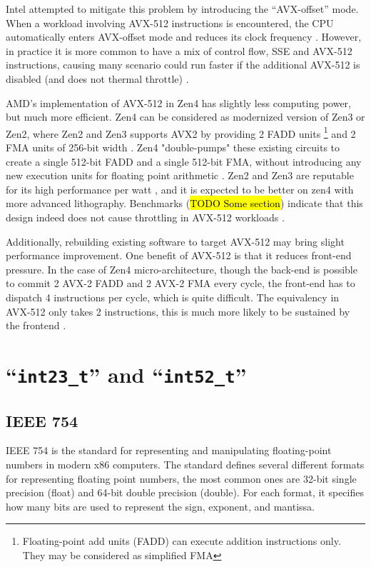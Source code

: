 \documentclass[logo,bsc,singlespacing,parskip]{infthesis}
\begin{document}
Intel attempted to mitigate this problem by introducing the ``AVX-offset'' mode.
When a workload involving AVX-512 instructions is encountered, the CPU
automatically enters AVX-offset mode and reduces its clock frequency
\cite{AVX-offset}. However, in practice it is more common to have a mix of
control flow, SSE and AVX-512 instructions, causing many scenario could run
faster if the additional AVX-512 is disabled (and does not thermal throttle)
\cite{Zen4Critique}.

AMD’s implementation of AVX-512 in Zen4 has slightly less computing power, but
much more efficient. Zen4 can be considered as modernized version of Zen3 or
Zen2, where Zen2 and Zen3 supports AVX2 by providing 2 FADD units
\footnote{Floating-point add units (FADD) can execute addition instructions
only. They may be considered as simplified FMA} and 2 FMA units of 256-bit width
\cite{Zen2ChipWiki}. Zen4 "double-pumps" these existing circuits to create a
single 512-bit FADD and a single 512-bit FMA, without introducing any new
execution units for floating point arithmetic \cite{Zen4Critique}. Zen2 and Zen3
are reputable for its high performance per watt \cite{ZenPerfPerWatt}, and it is
expected to be better on zen4 with more advanced lithography. Benchmarks
(\hl{TODO Some section}) indicate that this design indeed does not cause
throttling in AVX-512 workloads \cite{Zen4Critique}.

Additionally, rebuilding existing software to target AVX-512 may bring slight
performance improvement. One benefit of AVX-512 is that it reduces front-end
pressure. In the case of Zen4 micro-architecture, though the back-end is
possible to commit 2 AVX-2 FADD and 2 AVX-2 FMA every cycle, the front-end
has to dispatch 4 instructions per cycle, which is quite difficult. The
equivalency in AVX-512 only takes 2 instructions, this is much more likely to be
sustained by the frontend \cite{Zen4Critique}.


\section{``\texttt{int23\_t}'' and ``\texttt{int52\_t}''}
\label{sec:i23}
\subsection{IEEE 754}
IEEE 754 is the standard for representing and manipulating floating-point
numbers in modern x86 computers. The standard defines several different formats
for representing floating point numbers, the most common ones are 32-bit single
precision (float) and 64-bit double precision (double). For each format, it
specifies how many bits are used to represent the sign, exponent, and mantissa. 
\end{document}
